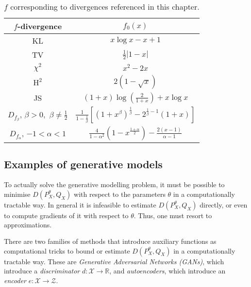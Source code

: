 {
\renewcommand{\arraystretch}{2}
\begin{table}
 \caption{$f$ corresponding to divergences referenced in this chapter.}
 \label{table:f-fns}
 \centering
 \begin{tabular}{c c} 
 \toprule
 $f$-divergence & $f_0(x)$ \\
 \midrule
 KL & $x \log x - x + 1$\\
 TV & $\frac{1}{2}|1-x|$\\
 $\chi^2$ & $x^2 - 2x$\\
 $\text{H}^2$ & $2(1-\sqrt{x})$\\
 JS & $(1+x)\log(\frac{2}{1+x}) + x\log x$\\
 $D_{f_\beta}$, $\beta > 0,$ $\beta\not=\frac{1}{2}$ & $\frac{1}{1-\frac{1}{\beta}}\left[ (1+x^\beta)^{\frac{1}{\beta}} - 2^{\frac{1}{\beta}-1}(1+x) \right]$\\
 $D_{f_\alpha}$, $-1<\alpha < 1$ & $\frac{4}{1-\alpha^2}\left( 1 - x^{\frac{1+\alpha}{2}} \right) - \frac{2(x-1)}{\alpha-1}$ \\
 \bottomrule
\end{tabular}
\end{table}
}





\subsection{Examples of generative models}

To actually solve the generative modelling problem, it must be possible to minimise $D(P^\theta_X, Q_X)$ with respect to the parameters $\theta$ in a computationally tractable way.
In general it is infeasible to estimate $D(P^\theta_X, Q_X)$ directly, or even to compute gradients of it with respect to $\theta$. 
Thus, one must resort to approximations.


There are two families of methods that introduce auxiliary functions as computational tricks to bound or estimate $D(P^\theta_X, Q_X)$ in a computationally tractable way.
These are \emph{Generative Adversarial Networks (GANs)}, which introduce a \emph{discriminator} $d:\mathcal{X} \to \mathbb{R}$, and \emph{autoencoders}, which introduce an \emph{encoder} $e:\mathcal{X} \to \mathcal{Z}$.

